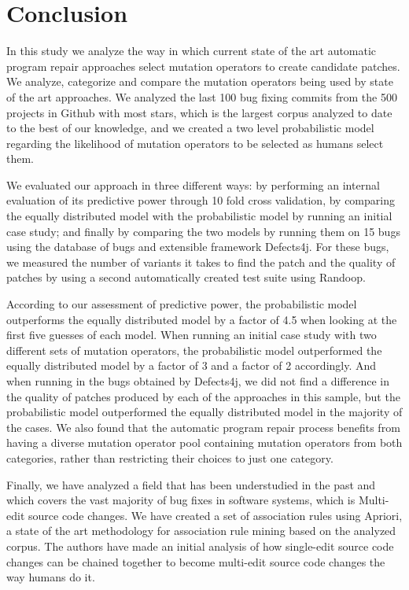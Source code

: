\documentclass[conference]{IEEEtran}
\begin{document}
\section{Conclusion} \label{conclusion}

In this study we analyze the way in which current state of the art automatic 
program repair approaches select mutation operators to create candidate 
patches. We analyze, categorize and compare the mutation operators being used by 
state of the art approaches. We analyzed the last 100 bug fixing commits from the
500 projects in Github with most stars, which is the largest corpus analyzed to date
to the best of our knowledge, and we created a two level probabilistic model regarding 
the likelihood of mutation operators to be selected as humans select them.

We evaluated our approach in three different ways: by performing an internal evaluation of 
its predictive power through 10 fold cross 
validation, by comparing the equally distributed model with the probabilistic
 model by running an initial case study; and finally by comparing the two models 
 by running them on 15 bugs using the database of bugs and extensible 
framework Defects4j. For these bugs, we measured the number of variants it takes to find the 
patch and the quality of patches by using a second automatically created test suite using Randoop. 

According to our assessment of predictive power, the probabilistic model outperforms
the equally distributed model by a factor of 4.5 when looking at the first five
guesses of each model. When running an initial case study with two different sets of mutation operators, the
probabilistic model outperformed the equally distributed model by a factor of 3
and a factor of 2 accordingly. And when running in the bugs obtained by
Defects4j, we did not find a difference in the quality of
patches produced by each of the approaches in this sample, but 
 the probabilistic model outperformed the equally distributed model in
the majority of the cases. We also found that the automatic program repair process benefits
from having a diverse mutation operator pool containing mutation operators from both categories,
rather than restricting their choices to just one category. 

Finally, we have analyzed a field that has been understudied in the past and which covers 
the vast majority of bug fixes in software systems, which is Multi-edit source code changes. 
We have created a set of association rules using Apriori, a state of the art
methodology for association rule mining based on the analyzed corpus. The authors have
made an initial analysis of how single-edit source code changes can be chained together 
to become multi-edit source code changes the way humans do it.
\end{document}
